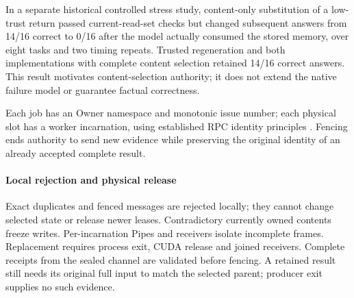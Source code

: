 
In a separate historical controlled stress study, content-only substitution
of a low-trust return passed current-read-set checks but changed subsequent
answers from 14/16 correct to 0/16 after the model actually consumed the
stored memory, over eight tasks and two timing repeats.
Trusted regeneration and both implementations with complete content
selection retained 14/16 correct answers.
This result motivates content-selection authority; it does not extend the
native failure model or guarantee factual correctness.

Each job has an Owner namespace and monotonic issue number; each physical
slot has a worker incarnation, using established RPC identity principles
\cite{birrell1984rpc}. Fencing ends authority to send new evidence while
preserving the original identity of an already accepted complete result.

\paragraph{Local rejection and physical release}
Exact duplicates and fenced messages are rejected locally; they cannot
change selected state or release newer leases. Contradictory currently
owned contents freeze writes. Per-incarnation Pipes and receivers isolate
incomplete frames. Replacement requires process exit, CUDA release and
joined receivers. Complete receipts from the sealed channel are validated
before fencing. A retained result still needs its original full input to
match the selected parent; producer exit supplies no such evidence.

